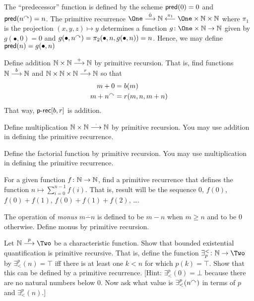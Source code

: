 \begin{example}
	The ``predecessor'' function is defined by the scheme $\mathord{\textsf{pred}}(0)=0$ and $\mathord{\textsf{pred}}(n^\curvearrowright) = n$. 
	The primitive recurrence
	$\One \stackrel{\hat0}{\longrightarrow} \NN \stackrel{\pi_1}{\longleftarrow} \One\times\NN\times\NN$ where $\pi_1$ is the projection $(x,y,z)\mapsto y$ determines a function $\fromto g{\One\times \NN}{\NN}$ given by
	$g(\bullet, 0) = 0$ and $g(\bullet,n^\curvearrowright) = \pi_2(\bullet, n, g(\bullet, n)) = n$. Hence, we may define $\mathord{\textsf{pred}}(n) = g(\bullet, n)$
\end{example}

\begin{exercises}
\begin{firstexercise}
	\item Define addition $\mathbb N\times \mathbb N\stackrel{+}{\longrightarrow}\mathbb N$ by primitive recursion. That is, find functions $\mathbb N\stackrel{b}{\longrightarrow}\mathbb N$ and $\mathbb N\times\mathbb N\times \mathbb N\stackrel{r}{\longrightarrow}\mathbb N$ so that
	\begin{align*}
		m+0 &= b(m)\\
		m+n^\curvearrowright &= r(m,n,m+n)
	\end{align*}
	That way, $\mathord{\textsf{p-rec}}[b,r]$ is addition.
	\item Define multiplication $\mathbb N\times \mathbb N\stackrel{\cdot}{\longrightarrow}\mathbb N$ by primitive recursion. You may use addition in defining the primitive recurrence.
	\item Define the factorial function by primitive recursion. You may use multiplication in defining the primitive recurrence.	
	\item For a given function ${f}\colon{\mathbb N}\to{\mathbb N}$, find a primitive recurrence that defines the function $n\mapsto \sum_{i=0}^{n-1}f(i)$. That is, result will be the sequence $0$, $f(0)$, $f(0)+f(1)$, $f(0)+f(1)+f(2)$, \ldots.
	\item The operation of \emph{monus} $m\stackrel{.}{-} n$ is defined to be $m-n$ when $m \geq n$ and to be $0$ otherwise. Define monus by primitive recursion.
	\item Let $\sfromto p\NN\Two$ be a characteristic function. Show that bounded existential quantification is primitive recursive. That is, define the function $\fromto {\exists^<_p}\NN\Two$ by $\exists^p_<(n) = \top$ iff there is at least one $k<n$ for which $p(k)=\top$.  Show that this can be defined by a primitive recurrence.
	[Hint: $\exists^p_<(0) = \bot$ because there are no natural numbers below $0$. 
	Now ask what value is $\exists^p_<(n^\curvearrowright)$ in terms of $p$ and $\exists^p_<(n)$.]
\end{firstexercise}
\end{exercises}

